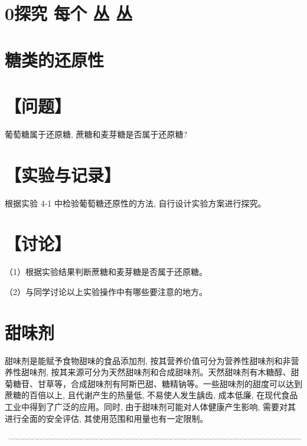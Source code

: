 \documentclass[10pt]{article}
\begin{document}
\section*{0探究 每个 丛 丛}

\section*{糖类的还原性}

\section*{【问题】}

葡萄糖属于还原糖, 蔗糖和麦芽糖是否属于还原糖?

\section*{【实验与记录】}

根据实验 4-1 中检验葡萄糖还原性的方法, 自行设计实验方案进行探究。

\begin{center}
\end{center}

\section*{【讨论】}

（1）根据实验结果判断蔗糖和麦芽糖是否属于还原糖。

（2）与同学讨论以上实验操作中有哪些要注意的地方。

\section*{甜味剂}

甜味剂是能赋予食物甜味的食品添加剂, 按其营养价值可分为营养性甜味剂和非营养性甜味剂, 按其来源可分为天然甜味剂和合成甜味剂。天然甜味剂有木糖醇、甜菊糖苷、甘草等，合成甜味剂有阿斯巴甜、糖精钠等。一些甜味剂的甜度可以达到蔗糖的百倍以上, 且代谢产生的热量低, 不易使人发生龋齿, 成本低廉, 在现代食品工业中得到了广泛的应用。同时, 由于甜味剂可能对人体健康产生影响, 需要对其进行全面的安全评估, 其使用范围和用量也有一定限制。

\begin{center}
\includegraphics[max width=1.0\textwidth]{images/0190efc5-b58a-7c43-bfb0-e0a030df9cfd_112_665457.jpg}
\end{center}
\end{document}
